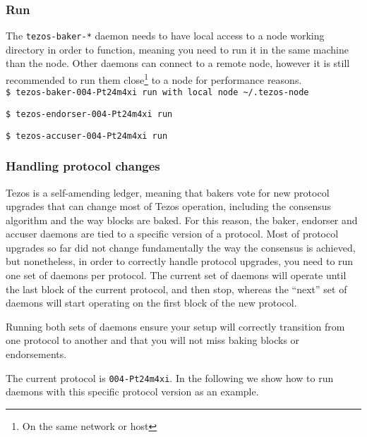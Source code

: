 \documentclass[a4paper,twocolumn,10pt]{article}
\begin{document}
\subsubsection{Run}

The \texttt{tezos-baker-*} daemon needs to have local access to a node
working directory in order to function, meaning you need to run it in
the same machine than the node. Other daemons can connect to a remote
node, however it is still recommended to run them close\footnote{On
  the same network or host} to a node for performance reasons.\\

\lstinline[style=BashInputStyle]'$ tezos-baker-004-Pt24m4xi run with local node ~/.tezos-node'

\lstinline[style=BashInputStyle]'$ tezos-endorser-004-Pt24m4xi run'

\lstinline[style=BashInputStyle]'$ tezos-accuser-004-Pt24m4xi run'

\subsubsection{Handling protocol changes}

Tezos is a self-amending ledger, meaning that bakers vote for new
protocol upgrades that can change most of Tezos operation, including
the consensus algorithm and the way blocks are baked. For this reason,
the baker, endorser and accuser daemons are tied to a specific version
of a protocol. Most of protocol upgrades so far did not change
fundamentally the way the consensus is achieved, but nonetheless, in
order to correctly handle protocol upgrades, you need to run one set
of daemons per protocol. The current set of daemons will operate until
the last block of the current protocol, and then stop, whereas the
“next” set of daemons will start operating on the first block of the
new protocol.

Running both sets of daemons ensure your setup will correctly
transition from one protocol to another and that you will not miss
baking blocks or endorsements.

The current protocol is \texttt{004-Pt24m4xi}. In the following we
show how to run daemons with this specific protocol version as an
example.

\end{document}

